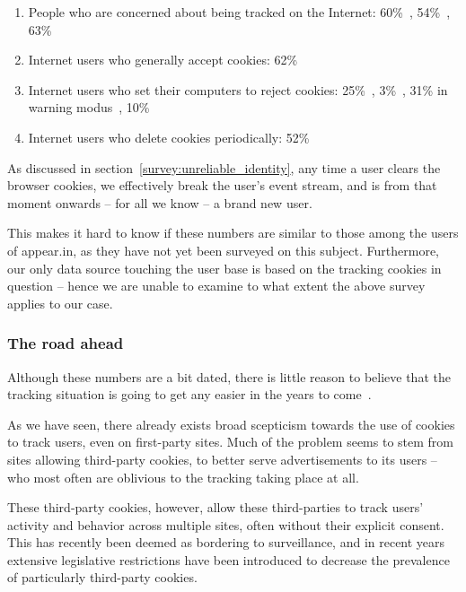 \begin{enumerate}
  \item People who are concerned about being tracked on the Internet: 60\%~\cite{CyberDialogue2001}, 54\%~\cite{Fox2000}, 63\%~\cite{Harris2000}
  \item Internet users who generally accept cookies: 62\%~\cite{PersonalizationConsortium2000}
  \item Internet users who set their computers to reject cookies: 25\%~\cite{Culnan2001}, 3\%~\cite{CyberDialogue2001}, 31\% in warning modus~\cite{CyberDialogue2001}, 10\%\cite{Fox2000}
  \item Internet users who delete cookies periodically: 52\%~\cite{PersonalizationConsortium2000}
\end{enumerate}

As discussed in section~\ref{survey:unreliable_identity}, any time a user clears the browser cookies, we effectively break the user's event stream, and is from that moment onwards -- for all we know -- a brand new user.

This makes it hard to know if these numbers are similar to those among the users of appear.in, as they have not yet been surveyed on this subject. Furthermore, our only data source touching the user base is based on the tracking cookies in question -- hence we are unable to examine to what extent the above survey applies to our case.

\subsubsection{The road ahead}

Although these numbers are a bit dated, there is little reason to believe that the tracking situation is going to get any easier in the years to come~\cite{RuizMartinez2012,Nikiforakis2013,Sorensen2013,Eijk2011}.

As we have seen, there already exists broad scepticism towards the use of cookies to track users, even on first-party sites. Much of the problem seems to stem from sites allowing third-party cookies, to better serve advertisements to its users -- who most often are oblivious to the tracking taking place at all.

These third-party cookies, however, allow these third-parties to track users' activity and behavior across multiple sites, often without their explicit consent. This has recently been deemed as bordering to surveillance, and in recent years extensive legislative restrictions have been introduced to decrease the prevalence of particularly third-party cookies.

